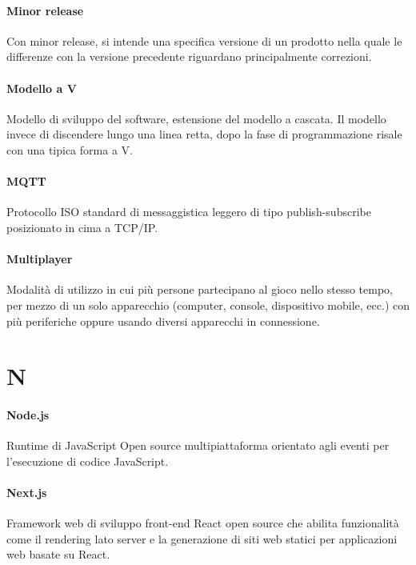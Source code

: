 \documentclass[]{article}
\begin{document}
	\paragraph*{Minor release}
	Con minor release, si intende una specifica versione di un prodotto nella quale le differenze con la versione precedente riguardano principalmente correzioni.

	\paragraph*{Modello a V}
	Modello di sviluppo del software, estensione del modello a cascata. Il modello invece di discendere lungo una linea retta, dopo la fase di programmazione risale con una tipica forma a V.

	\paragraph*{MQTT}
	Protocollo ISO standard di messaggistica leggero di tipo publish-subscribe posizionato in cima a TCP/IP.

	\paragraph*{Multiplayer}
	Modalità di utilizzo in cui più persone partecipano al gioco nello stesso tempo, per mezzo di un solo apparecchio (computer, console, dispositivo mobile, ecc.) con più periferiche oppure usando diversi apparecchi in connessione.

	\newpage

	\section*{N}

	\paragraph*{Node.js}
	Runtime di JavaScript Open source multipiattaforma orientato agli eventi per l'esecuzione di codice JavaScript.

	\paragraph*{Next.js}
	Framework web di sviluppo front-end React open source che abilita funzionalità come il rendering lato server e la generazione di siti web statici per applicazioni web basate su React.
\end{document}
